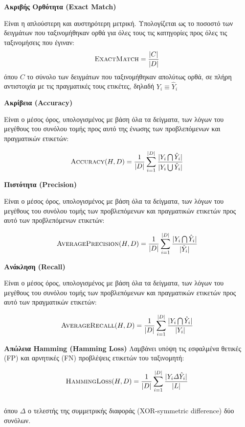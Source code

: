 \begin{description}
\item \textbf{Ακριβής Ορθότητα (Exact Match)}

Είναι η απλούστερη και αυστηρότερη μετρική. Υπολογίζεται ως το ποσοστό των δειγμάτων που ταξινομήθηκαν ορθά για όλες τους τις κατηγορίες προς όλες τις ταξινομήσεις που έγιναν:
\begin{equation} 
\textsc{ExactMatch}=\frac{|C|}{|D|} 
\end{equation}  
όπου $C$ το σύνολο των δειγμάτων που ταξινομήθηκαν απολύτως ορθά, σε πλήρη αντιστοιχία με τις πραγματικές τους ετικέτες, δηλαδή $Y_{i} \equiv \hat{Y}_{i}$

\item \textbf{Ακρίβεια (Accuracy)}

Είναι ο μέσος όρος, υπολογισμένος με βάση όλα τα δείγματα, των λόγων του μεγέθους του συνόλου τομής προς αυτό της ένωσης των προβλεπόμενων και πραγματικών ετικετών:

\begin{equation} 
\textsc{Accuracy}(H,D)=\frac{1}{|D|} \sum_{i=1}^{|D|} \frac{\lvert Y_{i} \bigcap \hat{Y}_{i}\rvert}{\lvert Y_i \bigcup \hat{Y}_{i}\rvert} 
\end{equation}

\item \textbf{Πιστότητα (Precision)}

Είναι ο μέσος όρος, υπολογισμένος με βάση όλα τα δείγματα, των λόγων του μεγέθους του συνόλου τομής των προβλεπόμενων και πραγματικών ετικετών προς αυτό των προβλεπόμενων ετικετών:

\begin{equation} 
\textsc{AveragePrecision}(H,D)=\frac{1}{|D|} \sum_{i=1}^{|D|} \frac{\lvert Y_i \bigcap \hat{Y}_{i}\rvert}{\lvert\hat{Y}_{i}\rvert} 
\end{equation} 

\item \textbf{Ανάκληση (Recall)}

Είναι ο μέσος όρος, υπολογισμένος με βάση όλα τα δείγματα, των λόγων του μεγέθους του συνόλου τομής των προβλεπόμενων και πραγματικών ετικετών προς αυτό των πραγματικών ετικετών:

\begin{equation} 
\textsc{AverageRecall}(H,D)=\frac{1}{|D|} \sum_{i=1}^{|D|} \frac{\lvert Y_i \bigcap \hat{Y}_{i}\rvert}{\lvert{Y}_{i}\rvert} 
\end{equation} 

\item \textbf{Απώλεια Hamming (Hamming Loss)}
Λαμβάνει υπόψη τις εσφαλμένα θετικές (FP) και αρνητικές (FN) προβλέψεις ετικετών του ταξινομητή:


\begin{equation} 
\textsc{HammingLoss}(H,D)=\frac{1}{|D|} \sum_{i=1}^{|D|} \frac{\lvert Y_{i} \varDelta \hat{Y}_{i}\rvert}{\lvert L\rvert} 
\end{equation}  
\\
όπου $\varDelta$ ο τελεστής της συμμετρικής διαφοράς (XOR-symmetric difference) δύο συνόλων.

\end{description}

